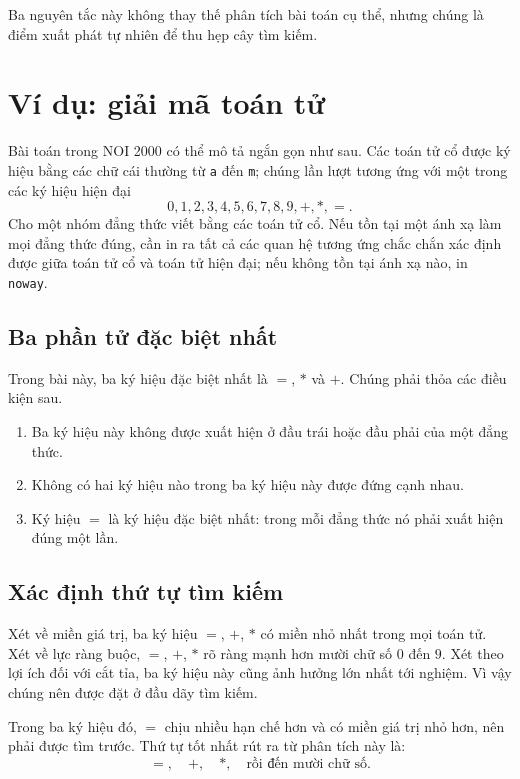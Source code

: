 \documentclass[11pt]{article}
\begin{document}
Ba nguyên tắc này không thay thế phân tích bài toán cụ thể, nhưng chúng là
điểm xuất phát tự nhiên để thu hẹp cây tìm kiếm.

\section{Ví dụ: giải mã toán tử}

Bài toán  trong NOI 2000 có thể mô tả ngắn gọn như sau.
Các toán tử cổ được ký hiệu bằng các chữ cái thường từ \texttt{a} đến
\texttt{m}; chúng lần lượt tương ứng với một trong các ký hiệu hiện đại
\[
  0,1,2,3,4,5,6,7,8,9,+,*,=.
\]
Cho một nhóm đẳng thức viết bằng các toán tử cổ. Nếu tồn tại một ánh xạ làm
mọi đẳng thức đúng, cần in ra tất cả các quan hệ tương ứng chắc chắn xác định
được giữa toán tử cổ và toán tử hiện đại; nếu không tồn tại ánh xạ nào, in
\texttt{noway}.

\subsection{Ba phần tử đặc biệt nhất}

Trong bài này, ba ký hiệu đặc biệt nhất là \(=\), \(*\) và \(+\). Chúng phải
thỏa các điều kiện sau.

\begin{enumerate}
  \item Ba ký hiệu này không được xuất hiện ở đầu trái hoặc đầu phải của một
  đẳng thức.
  \item Không có hai ký hiệu nào trong ba ký hiệu này được đứng cạnh nhau.
  \item Ký hiệu \(=\) là ký hiệu đặc biệt nhất: trong mỗi đẳng thức nó phải
  xuất hiện đúng một lần.
\end{enumerate}

\subsection{Xác định thứ tự tìm kiếm}

Xét về miền giá trị, ba ký hiệu \(=\), \(+\), \(*\) có miền nhỏ nhất trong mọi
toán tử. Xét về lực ràng buộc, \(=\), \(+\), \(*\) rõ ràng mạnh hơn mười chữ
số \(0\) đến \(9\). Xét theo lợi ích đối với cắt tỉa, ba ký hiệu này cũng ảnh
hưởng lớn nhất tới nghiệm. Vì vậy chúng nên được đặt ở đầu dãy tìm kiếm.

Trong ba ký hiệu đó, \(=\) chịu nhiều hạn chế hơn và có miền giá trị nhỏ hơn,
nên phải được tìm trước. Thứ tự tốt nhất rút ra từ phân tích này là:
\[
  =,\quad +,\quad *,\quad \text{rồi đến mười chữ số.}
\]
\end{document}
